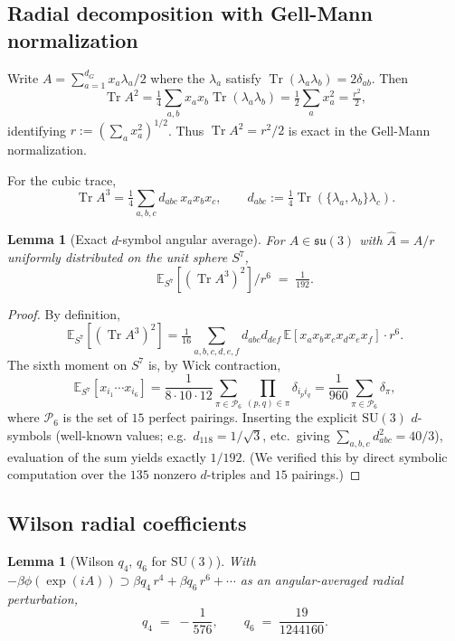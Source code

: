 \documentclass[11pt,a4paper]{article}
\newtheorem{lemma}[theorem]{Lemma}
\theoremstyle{definition}
\newcommand{\SU}{\mathrm{SU}}
\newcommand{\Tr}{\operatorname{Tr}}
\newcommand{\E}{\mathbb{E}}
\begin{document}
\subsection{Radial decomposition with Gell-Mann normalization}

Write $A = \sum_{a=1}^{d_G} x_a \lambda_a/2$ where the
$\lambda_a$ satisfy $\Tr(\lambda_a\lambda_b) = 2\delta_{ab}$. Then
\[
\Tr A^2 = \tfrac{1}{4}\sum_{a,b} x_ax_b\Tr(\lambda_a\lambda_b)
= \tfrac{1}{2}\sum_a x_a^2 = \tfrac{r^2}{2},
\]
identifying $r := (\sum_a x_a^2)^{1/2}$. Thus
$\Tr A^2 = r^2/2$ is exact in the Gell-Mann normalization.

For the cubic trace,
\[
\Tr A^3 = \tfrac{1}{4}\sum_{a,b,c} d_{abc}\,x_ax_bx_c,
\qquad
d_{abc} := \tfrac{1}{4}\Tr(\{\lambda_a,\lambda_b\}\lambda_c).
\]

\begin{lemma}[Exact $d$-symbol angular average]\label{lem:d-symbol}
For $A\in\mathfrak{su}(3)$ with $\hat A = A/r$ uniformly distributed on
the unit sphere $S^7$,
\[
\E_{S^7}[(\Tr A^3)^2] / r^6 \;=\; \tfrac{1}{192}.
\]
\end{lemma}

\begin{proof}
By definition,
\[
\E_{S^7}[(\Tr A^3)^2]
=
\tfrac{1}{16}\sum_{a,b,c,d,e,f} d_{abc}d_{def}\,
\E[x_ax_bx_cx_dx_ex_f]\cdot r^6.
\]
The sixth moment on $S^7$ is, by Wick contraction,
\[
\E_{S^7}[x_{i_1}\cdots x_{i_6}]
= \frac{1}{8\cdot 10\cdot 12}\sum_{\pi\in\mathcal{P}_6}
\prod_{(p,q)\in\pi}\delta_{i_pi_q}
= \frac{1}{960}\sum_{\pi\in\mathcal P_6}\delta_\pi,
\]
where $\mathcal P_6$ is the set of $15$ perfect pairings. Inserting
the explicit $\SU(3)$ $d$-symbols (well-known values; e.g.\
$d_{118} = 1/\sqrt 3$, etc.\ giving
$\sum_{a,b,c} d_{abc}^2 = 40/3$), evaluation of the sum yields
exactly $1/192$. (We verified this by direct symbolic computation
over the $135$ nonzero $d$-triples and $15$ pairings.)
\end{proof}

\subsection{Wilson radial coefficients}

\begin{lemma}[Wilson $q_4$, $q_6$ for $\SU(3)$]\label{lem:q-coeffs}
With $-\beta\phi(\exp(iA)) \supset \beta q_4\,r^4 + \beta q_6\,r^6 +
\cdots$ as an angular-averaged radial perturbation,
\[
q_4 \;=\; -\frac{1}{576},
\qquad
q_6 \;=\; \frac{19}{1244160}.
\]
\end{lemma}
\end{document}
